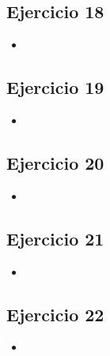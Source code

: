 \documentclass[10pt,a4paper]{article}
\begin{document}
\subsection{Ejercicio 18}
\begin{itemize}
\item
\end{itemize}

\subsection{Ejercicio 19}
\begin{itemize}
\item
\end{itemize}


\subsection{Ejercicio 20}
\begin{itemize}
\item
\end{itemize}

\subsection{Ejercicio 21}
\begin{itemize}
\item
\end{itemize}

\subsection{Ejercicio 22}
\begin{itemize}
\item
\end{itemize}
\end{document}
